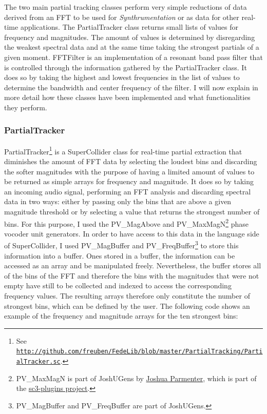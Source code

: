 The two main partial tracking classes perform very simple reductions of data derived from an FFT to be used for \emph{Synthrumentation} or as data for other real-time applications. The PartialTracker class returns small lists of values for frequency and magnitudes. The amount of values is determined by disregarding the weakest spectral data and at the same time taking the strongest partials of a given moment. FFTFilter is an implementation of a resonant band pass filter that is controlled through the information gathered by the PartialTracker class. It does so by taking the highest and lowest frequencies in the list of values to determine the bandwidth and center frequency of the filter. I will now explain in more detail how these classes have been implemented and what functionalities they perform.

\subsubsection{PartialTracker}
\hypertarget{partrack}{}

PartialTracker\footnote{See \href{http://github.com/freuben/FedeLib/blob/master/PartialTracking/PartialTracker.sc} {\texttt{http://github.com/freuben/FedeLib/blob/master/PartialTracking/PartialTracker.sc}}.} is a SuperCollider class for real-time partial extraction that diminishes the amount of FFT data by selecting the loudest bins and discarding the softer magnitudes with the purpose of having a limited amount of values to be returned as simple arrays for frequency and magnitude. It does so by taking an incoming audio signal, performing an FFT analysis and discarding spectral data in two ways: either by passing only the bins that are above a given magnitude threshold or by selecting a value that returns the strongest number of bins. For this purpose, I used the PV\_MagAbove and PV\_MaxMagN\footnote{PV\_MaxMagN is part of JoshUGens by \href{http://www.realizedsound.net/josh/}{Joshua Parmenter}, which is part of the \href{http://sourceforge.net/projects/sc3-plugins/}{sc3-plugins project}.} phase vocoder unit generators. In order to have access to this data in the language side of SuperCollider, I used PV\_MagBuffer and PV\_FreqBuffer\footnote{PV\_MagBuffer and PV\_FreqBuffer are part of JoshUGens.} to store this information into a buffer. Ones stored in a buffer, the information can be accessed as an array and be manipulated freely. Nevertheless, the buffer stores all of the bins of the FFT and therefore the bins with the magnitudes that were not empty have still to be collected and indexed to access the corresponding frequency values. The resulting arrays therefore only constitute the number of strongest bins, which can be defined by the user. The following code shows an example of the frequency and magnitude arrays for the ten strongest bins:

